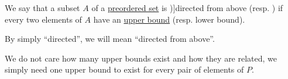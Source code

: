 \begin{definition}\label{def:directed_set}
  We say that a subset \( A \) of a \hyperref[def:preordered_set]{preordered set} is \term[bg=насочено надясно (множество) (\cite[10]{Проданов1982ФункАнализТом1})]{directed from above} (resp. ) if every two elements of \( A \) have an \hyperref[def:extremal_points/bounds]{upper bound} (resp. lower bound).

  By simply \enquote{directed}, we will mean \enquote{directed from above}.
\end{definition}
\begin{comments}
  \item We do not care how many upper bounds exist and how they are related, we simply need one upper bound to exist for every pair of elements of \( P \).
\end{comments}

